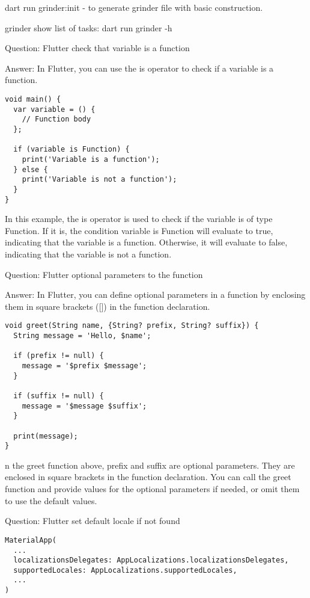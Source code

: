 dart run grinder:init - to generate grinder file with basic construction.

grinder show list of tasks: dart run grinder -h

Question: Flutter check that variable is a function

Answer: In Flutter, you can use the is operator to check if a variable is a function. 

\begin{lstlisting}
void main() {
  var variable = () {
    // Function body
  };

  if (variable is Function) {
    print('Variable is a function');
  } else {
    print('Variable is not a function');
  }
}
\end{lstlisting}

In this example, the is operator is used to check if the variable is of type Function. If it is, the condition 
variable is Function will evaluate to true, indicating that the variable is a function. Otherwise, it will 
evaluate to false, indicating that the variable is not a function.


Question: Flutter optional parameters to the function

Answer: In Flutter, you can define optional parameters in a function by enclosing them in square brackets 
([]) in the function declaration. 

\begin{lstlisting}
void greet(String name, {String? prefix, String? suffix}) {
  String message = 'Hello, $name';

  if (prefix != null) {
    message = '$prefix $message';
  }

  if (suffix != null) {
    message = '$message $suffix';
  }

  print(message);
}
\end{lstlisting}

n the greet function above, prefix and suffix are optional parameters. They are enclosed in square brackets 
in the function declaration. You can call the greet function and provide values for the optional parameters 
if needed, or omit them to use the default values. 

Question: Flutter set default locale if not found

\begin{lstlisting}
MaterialApp(
  ...
  localizationsDelegates: AppLocalizations.localizationsDelegates,
  supportedLocales: AppLocalizations.supportedLocales,
  ...
)
\end{lstlisting}


